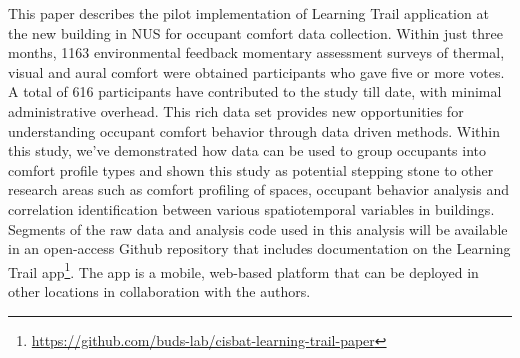 
This paper describes the pilot implementation of Learning Trail application at the new building in NUS for occupant comfort data collection. Within just three months, 1163 environmental feedback momentary assessment surveys of thermal, visual and aural comfort were obtained participants who gave five or more votes. A total of 616 participants have contributed to the study till date, with minimal administrative overhead. This rich data set provides new opportunities for understanding occupant comfort behavior through data driven methods. Within this study, we've demonstrated how data can be used to group occupants into comfort profile types and shown this study as potential stepping stone to other research areas such as comfort profiling of spaces, occupant behavior analysis and correlation identification between various spatiotemporal variables in buildings. 
Segments of the raw data and analysis code used in this analysis will be available in an open-access Github repository that includes documentation on the Learning Trail app\footnote{\url{https://github.com/buds-lab/cisbat-learning-trail-paper}}. The app is a mobile, web-based platform that can be deployed in other locations in collaboration with the authors.





